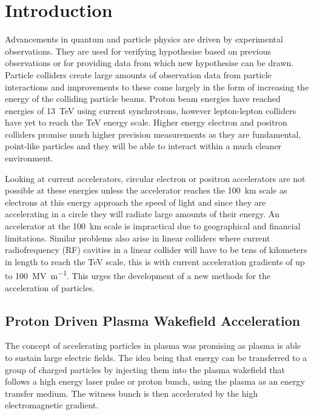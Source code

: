 
\chapter{Introduction}

Advancements in quantum and particle physics are driven by experimental
observations. They are used for verifying hypothesise based on previous
observations or for providing data from which new hypothesise can be drawn.
Particle colliders create large amounts of observation data from particle
interactions and improvements to these come largely in the form of increasing
the energy of the colliding particle beams. Proton beam energies have reached
energies of \SI{13}{\tera\electronvolt} using current synchrotrons, however
lepton-lepton colliders have yet to reach the \si{\tera\electronvolt} energy
scale.  Higher energy electron and positron colliders promise much higher
precision measurements as they are fundamental, point-like particles and they
will be able to interact within a much cleaner environment.

Looking at current accelerators, circular electron or positron accelerators are
not possible at these energies unless the accelerator reaches the
\SI{100}{\kilo\meter} scale as electrons at this energy approach the speed of
light and since they are accelerating in a circle they will radiate large
amounts of their energy. An accelerator at the \SI{100}{\kilo\meter} scale is
impractical due to geographical and financial limitations.  Similar problems
also arise in linear colliders where current radiofrequency (RF) cavities in a
linear collider will have to be tens of kilometers in length to reach the
\si{\tera\electronvolt} scale, this is with current acceleration gradients of
up to \SI{100}{\mega\volt\per\meter}.  This urges the development of a new
methods for the acceleration of particles.

\section{Proton Driven Plasma Wakefield Acceleration}

The concept of accelerating particles in plasma was promising as plasma is able
to sustain large electric fields.  The idea being that energy can be
transferred to a group of charged particles by injecting them into the plasma
wakefield that follows a high energy laser pulse or proton bunch, using the
plasma as an energy transfer medium.  The witness bunch is then accelerated by
the high electromagnetic gradient.

